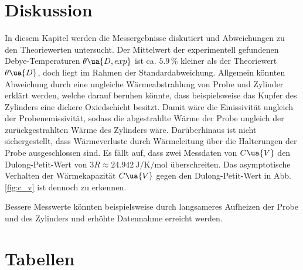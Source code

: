 \section{Diskussion}
\label{sec:diskussion}

In diesem Kapitel werden die Messergebnisse diskutiert und Abweichungen zu den Theoriewerten untersucht.
Der Mittelwert der experimentell gefundenen Debye-Temperaturen $\theta\ua{D, exp}$ ist ca.
$\num{5.9}\,\%$ kleiner als der Theoriewert $\theta\ua{D}$, doch liegt im Rahmen der
Standardabweichung.
Allgemein könnten Abweichung durch eine ungleiche Wärmeabstrahlung von Probe und Zylinder
erklärt werden, welche darauf beruhen könnte, dass beispielsweise das Kupfer
des Zylinders eine dickere Oxiedschicht besitzt. Damit wäre die Emissivität ungleich
der Probenemissivität, sodass die abgestrahlte Wärme der Probe ungleich der
zurückgestrahlten Wärme des Zylinders wäre.
Darüberhinaus ist nicht sichergestellt, dass Wärmeverluste durch
Wärmeleitung über die Halterungen der Probe ausgeschlossen sind.
Es fällt auf, dass zwei Messdaten von $C\ua{V}$ den Dulong-Petit-Wert von
$3R \approx \SI{24.942}{\joule\per\kelvin\per\mol}$ überschreiten.
Das asymptotische Verhalten der Wärmekapazität $C\ua{V}$ gegen den
Dulong-Petit-Wert in Abb. \ref{fig:c_v} ist dennoch zu erkennen.

Bessere Messwerte könnten beispielsweise durch langsameres Aufheizen der Probe und des Zylinders und
erhöhte Datennahme erreicht werden.
\newpage
\pagestyle{empty}
\section{Tabellen}
\label{sec:tabellen}


